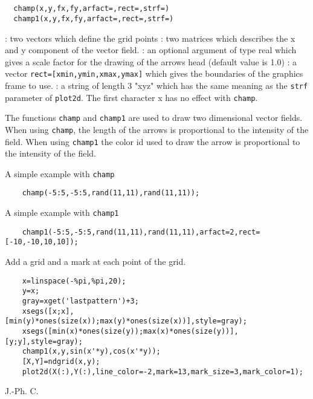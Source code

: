 \begin{mandesc}
  \\ %
  \\ %
\end{mandesc}
\begin{calling_sequence}
\begin{verbatim}
  champ(x,y,fx,fy,arfact=,rect=,strf=)
  champ1(x,y,fx,fy,arfact=,rect=,strf=)
\end{verbatim}
\end{calling_sequence}
\begin{parameters}
  \begin{varlist}
    : two vectors which define the grid points
    : two matrices which describes the x and y component of the vector field.
    : an optional argument of type real which gives a scale factor
    for the drawing of the arrows head (default value is 1.0)
    : a vector \verb!rect=[xmin,ymin,xmax,ymax]! which gives
    the boundaries of the graphics frame to use.
    : a string of length 3 "xyz" which has the same meaning as the
    \verb!strf! parameter of \verb!plot2d!. The first
    character x has no effect with \verb!champ!.
  \end{varlist}
\end{parameters}

\begin{mandescription}
  The functions \verb!champ! and \verb!champ1! are used to draw two dimensional
  vector fields. When using \verb!champ!, the length of the arrows is proportional to the intensity of the field.
  When using \verb!champ1! the color id used to draw the arrow is proportional to the intensity of the field.
\end{mandescription}
\begin{examples}
  \noindent A simple example with \verb!champ!
  \begin{Verbatim}
    champ(-5:5,-5:5,rand(11,11),rand(11,11));
  \end{Verbatim}
  \noindent A simple example with \verb!champ1!
  \begin{Verbatim}
    champ1(-5:5,-5:5,rand(11,11),rand(11,11),arfact=2,rect=[-10,-10,10,10]);
  \end{Verbatim}

  \noindent Add a grid and a mark at each point of the grid.
  \begin{Verbatim}
    x=linspace(-%pi,%pi,20);
    y=x;
    gray=xget('lastpattern')+3;
    xsegs([x;x],[min(y)*ones(size(x));max(y)*ones(size(x))],style=gray);
    xsegs([min(x)*ones(size(y));max(x)*ones(size(y))],[y;y],style=gray);
    champ1(x,y,sin(x'*y),cos(x'*y));
    [X,Y]=ndgrid(x,y);
    plot2d(X(:),Y(:),line_color=-2,mark=13,mark_size=3,mark_color=1);
  \end{Verbatim}

\end{examples}
\begin{authors}
  J.-Ph. C.
\end{authors}
